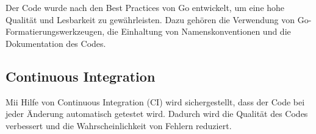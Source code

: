 Der Code wurde nach den Best Practices von Go entwickelt, um eine hohe Qualität und Lesbarkeit zu gewährleisten. Dazu gehören die Verwendung von Go-Formatierungswerkzeugen, die Einhaltung von Namenskonventionen und die Dokumentation des Codes.

\subsection{Continuous Integration}

Mii Hilfe von Continuous Integration (CI) wird sichergestellt, dass der Code bei jeder Änderung automatisch getestet wird. Dadurch wird die Qualität des Codes verbessert und die Wahrscheinlichkeit von Fehlern reduziert. \cite{github_actions_docs}

\newpage
